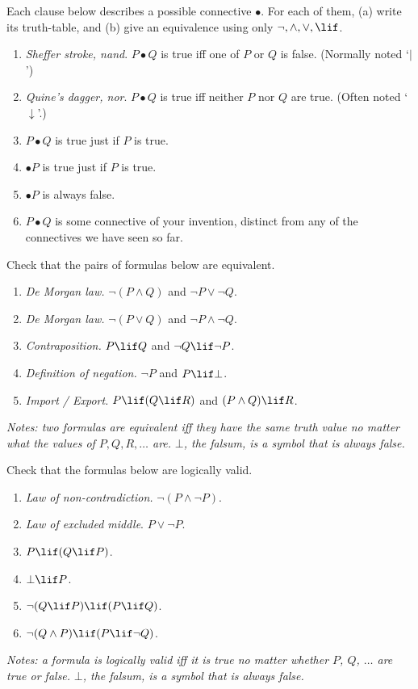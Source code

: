\documentclass[../../../include/open-logic-section]{subfiles}
\begin{document}
\begin{prob}
Each clause below describes a possible connective $\bullet$. For each
of them, (a) write its truth-table, and (b) give an equivalence using
only $\lnot,\land,\lor,\lif$. 
\begin{enumerate}
\item \emph{Sheffer stroke, nand}. $P\bullet Q$ is true iff one of $P$ or $Q$
is false. (Normally noted `$|$')
\item \emph{Quine's dagger, nor}. $P\bullet Q$ is true iff neither $P$ nor $Q$ are true.
(Often noted `$\downarrow$'.)
\item $P\bullet Q$ is true just if $P$ is true.
\item $\bullet P$ is true just if $P$ is true.
\item $\bullet P$ is always false.
\item $P\bullet Q$ is some connective of your invention, distinct from
any of the connectives we have seen so far. 
\end{enumerate}
\end{prob}

\begin{prob}
Check that the pairs of formulas below are equivalent.
\begin{enumerate}
\item \emph{De Morgan law.} $\lnot(P\land Q)$ and $\lnot P\lor\lnot Q$.
\item \emph{De Morgan law.} $\lnot(P\lor Q)$ and $\lnot P\land\lnot Q$.
\item \emph{Contraposition.} $P\lif Q$ and $\lnot Q\lif\lnot P$. 
\item \emph{Definition of negation.} $\lnot P$ and $P\lif\bot$.
\item \emph{Import / Export.} $P\lif(Q\lif R)$ and $(P\land Q)\lif R$. 
\end{enumerate}

\emph{Notes: two formulas are equivalent iff they have the same truth
value no matter what the values of $P,Q,R,\ldots$ are.}
\emph{$\bot$, the falsum, is a symbol that is always false.}
\end{prob}

\begin{prob}
Check that the formulas below are logically valid. 
\begin{enumerate}
\item \emph{Law of non-contradiction. }$\lnot(P\land\lnot P)$.
\item \emph{Law of excluded middle}. $P\lor\lnot P$.
\item $P\lif(Q\lif P)$.
\item $\bot\lif P$.
\item $\lnot(Q\lif P)\lif(P\lif Q)$.
\item $\lnot(Q\land P)\lif(P\lif\lnot Q)$.
\end{enumerate}
\emph{Notes: a formula is logically valid iff it is true no matter
whether $P$, $Q$, $\ldots$ are true or false.}
\emph{$\bot$, the falsum, is a symbol that is always false.}
\end{prob}
\end{document}
